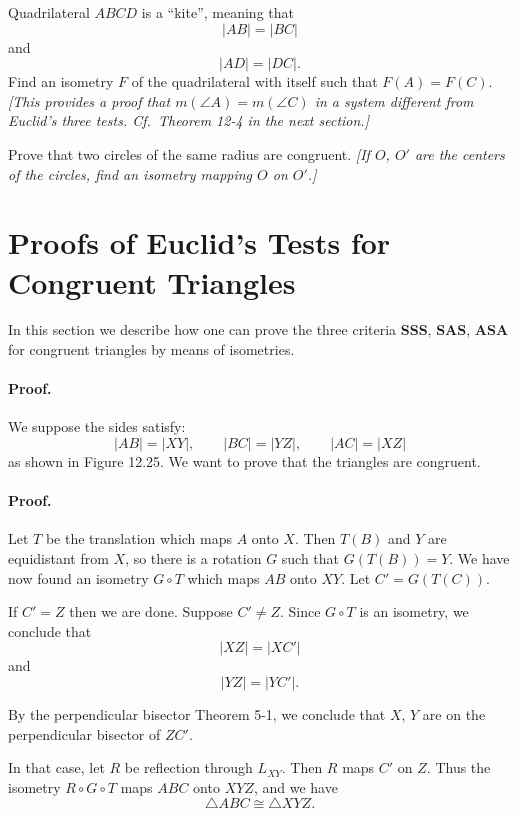 \documentclass[12pt]{book} %
\begin{document}
\begin{ExerciseList}
\begin{ExerciseList}
\begin{ExerciseList}
\Exercise Quadrilateral $ABCD$ is a ``kite'', meaning that
\[
|AB|=|BC|
\]
and
\[
|AD|=|DC|.
\]
Find an isometry $F$ of the quadrilateral with itself such that $F(A)=F(C)$.
\textit{[This provides a proof that $m(\angle A)=m(\angle C)$ in a system different from Euclid's three tests. Cf.\ Theorem 12-4 in the next section.]}


\Exercise Prove that two circles of the same radius are congruent. \textit{[If $O$, $O'$ are the centers of the circles, find an isometry mapping $O$ on $O'$.]}

\section{Proofs of Euclid's Tests for Congruent Triangles}

In this section we describe how one can prove the three criteria \textbf{SSS}, \textbf{SAS}, \textbf{ASA} for congruent triangles by means of isometries.


\paragraph{Proof.}
We suppose the sides satisfy:
\[
|AB|=|XY|,\qquad |BC|=|YZ|,\qquad |AC|=|XZ|
\]
as shown in Figure 12.25. We want to prove that the triangles are congruent.

\paragraph{Proof.}
Let $T$ be the translation which maps $A$ onto $X$. Then $T(B)$ and $Y$
are equidistant from $X$, so there is a rotation $G$ such that $G(T(B)) = Y$.
We have now found an isometry $G \circ T$ which maps $AB$ onto $XY$. Let
$C' = G(T(C))$.

If $C' = Z$ then we are done. Suppose $C' \ne Z$. Since $G \circ T$ is an isometry,
we conclude that
\[
|XZ| = |XC'|
\]
and
\[
|YZ| = |YC'|.
\]

By the perpendicular bisector Theorem 5-1, we conclude that $X$, $Y$ are
on the perpendicular bisector of $ZC'$.


In that case, let $R$ be reflection through $L_{XY}$. Then $R$ maps $C'$ on $Z$.
Thus the isometry $R \circ G \circ T$ maps $ABC$ onto $XYZ$, and we have
\[
\triangle ABC \cong \triangle XYZ.
\]


\end{ExerciseList}
\end{ExerciseList}
\end{ExerciseList}
\end{document}
